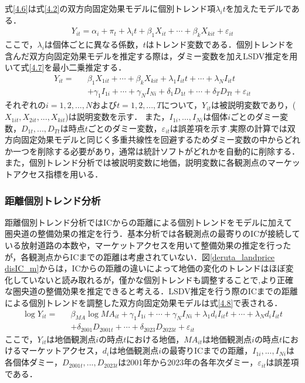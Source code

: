 式\ref{4.6}は式\ref{4.2}の双方向固定効果モデルに個別トレンド項$\lambda_{i}t$を加えたモデルである．
\begin{eqnarray}
  Y_{it}= \alpha_{i} + \pi_{t} +\lambda_{i}t + \beta_{1}X_{it} + \cdots  + \beta_{k}X_{kit} + \varepsilon_{it}
\label{4.6} 
\end{eqnarray}
ここで，$\lambda_{i}$は個体ごとに異なる係数，$t$はトレンド変数である．個別トレンドを含んだ双方向固定効果モデルを推定する際は，ダミー変数を加えLSDV推定を用いて式\ref{4.7}を最小二乗推定する．
\begin{eqnarray}
  Y_{it} = &&\beta_{1}X_{1it} + \cdots  + \beta_{k}X_{kit} + \lambda_{1}I_{it}t+ \cdots  + \lambda_{N}I_{it}t \nonumber \\
    &&+ \gamma_{1}I_{1i} + \cdots + \gamma_{N}I_{Ni} + \delta_{1}D_{1t} + \cdots + \delta_{T}D_{Tt} + \varepsilon_{it}
  \label{4.7}
\end{eqnarray}
それぞれの$i=1,2,...,N$および$t=1,2,...,T$について，$Y_{it}$は被説明変数であり，($X_{1it},X_{2it},...,X_{kit}$)は説明変数を示す．
また，$I_{1i},...,I_{Ni}$は個体$i$ごとのダミー変数，$D_{1t},...,D_{Tt}$は時点$t$ごとのダミー変数，$\varepsilon_{it}$は誤差項を示す.実際の計算では双方向固定効果モデルと同じく多重共線性を回避するためダミー変数の中からどれか一つを削除する必要があり，通常は統計ソフトがどれかを自動的に削除する．
また，個別トレンド分析では被説明変数に地価，説明変数に各観測点のマーケットアクセス指標を用いる．

\subsubsection{距離個別トレンド分析}
距離個別トレンド分析ではICからの距離による個別トレンドをモデルに加えて圏央道の整備効果の推定を行う．基本分析では各観測点の最寄りのICが接続している放射道路の本数や，マーケットアクセスを用いて整備効果の推定を行ったが，各観測点からICまでの距離は考慮されていない．図\ref{deruta_landprice disIC_m}からは，ICからの距離の違いによって地価の変化のトレンドはほぼ変化していないと読み取れるが，僅かな個別トレンドも調整することで,より正確な圏央道の整備効果を推定できると考える．LSDV推定を行う際のICまでの距離による個別トレンドを調整した双方向固定効果モデルは式\ref{4.8}で表される．
\begin{eqnarray}
  \log{Y_{it}}= &&\beta_{MA}\log{{MA}_{it}}+ \gamma_{1}I_{1i} + \cdots + \gamma_{N}I_{Ni} + \lambda_{1}d_{i}I_{it}t+ \cdots  + \lambda_{N}d_{i}I_{it}t \nonumber \\
    && + \delta_{2001}D_{2001t} + \cdots + \delta_{2023}D_{2023t} + \varepsilon_{it}
  \label{4.8}
\end{eqnarray}
ここで，$Y_{it}$は地価観測点$i$の時点$t$における地価，$MA_{it}$は地価観測点$i$の時点$t$におけるマーケットアクセス，$d_{i}$は地価観測点$i$の最寄りICまでの距離，$I_{1i},...,I_{Ni}$は各個体ダミー，$D_{2001t},...,D_{2023t}$は2001年から2023年の各年次ダミー，$\varepsilon_{it}$は誤差項である．

